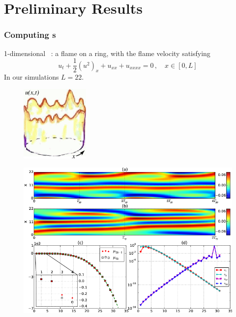 \documentclass[mathserif, handout]{beamer}
\begin{document}
\section{Preliminary Results}

\begin{frame}[allowframebreaks]
  \frametitle{Computing \Fv s}

  1-dimensional \KSe\ :
  a flame on a ring, with the flame velocity satisfying
  \[
    u_t+\frac{1}{2}(u^2)_x+u_{xx}+u_{xxxx}=0\,,\quad x\in [0,L]
  \]
  In our simulations $L=22$.
  \begin{figure}[h]
    \centering
    \includegraphics[width=0.3\textwidth]{flameFlut}
  \end{figure}


  \begin{figure}[h]
    \centering
    \includegraphics[width=0.9\linewidth]{pprpfigure}
    \label{fig:ppo1state}
  \end{figure}


\end{frame}
\end{document}
